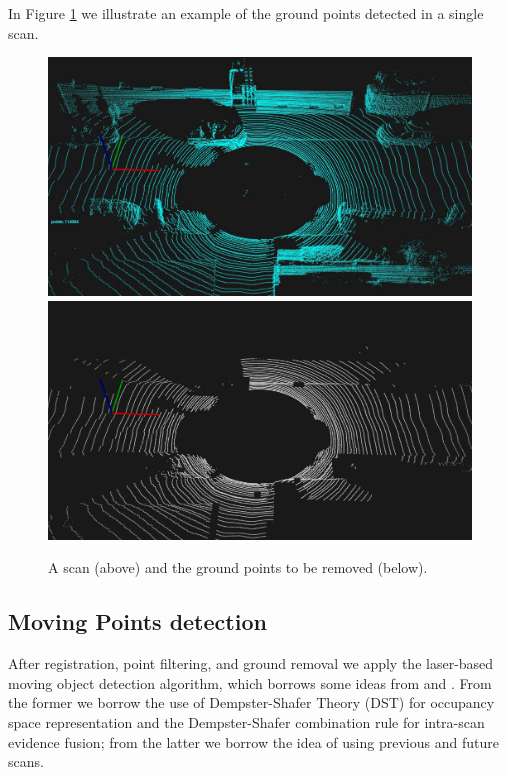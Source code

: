 In Figure \ref{fig:groundremoval} we illustrate an example of the ground points detected in a single scan.



\begin{figure}
\setlength{\tabcolsep}{1pt}
\begin{center}
\includegraphics[width=0.99\columnwidth]{./img/ch-laser/beforeGroundRemoval} \\
\vspace{0.3cm}
\includegraphics[width=0.99\columnwidth]{./img/ch-laser/postGroundRemoval}
\end{center}
\caption{A scan (above) and the ground points to be removed (below).}
\label{fig:groundremoval}
\end{figure}

\subsection{Moving Points detection}
After registration, point filtering, and ground removal we apply the laser-based moving object detection algorithm, which borrows some ideas from  \cite{xiao2013change} and \cite{vallet2015extracting}. From the former we borrow the use of Dempster-Shafer Theory (DST) for occupancy space representation and the Dempster-Shafer combination rule for intra-scan evidence fusion; from the latter we borrow the idea of using previous and future scans.

